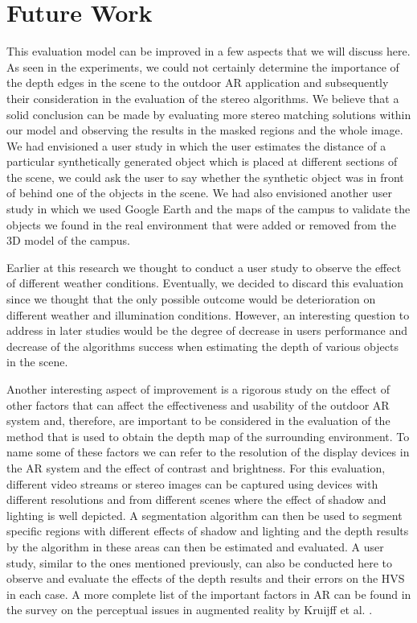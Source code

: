 \section{Future Work}
This evaluation model can be improved in a few aspects that we will discuss here.
As seen in the experiments, we could not certainly determine the importance of the depth edges in the scene to the outdoor AR application and subsequently their consideration in the evaluation 
of the stereo algorithms. We believe that a solid conclusion can be made by evaluating more stereo matching solutions
within our model and observing the results in the masked regions and the whole image. We had envisioned a user study in which the user estimates 
the distance of a particular synthetically generated object which is placed at different sections of the scene, we could ask the user
to say whether the synthetic object was in front of behind one of the objects in the scene. We had also envisioned another user study in which we used Google Earth 
and the maps of the campus to validate the objects we found in the real environment that were added or removed from the 3D model of the campus.

Earlier at this research we thought to conduct a user study to observe the effect of different weather conditions.
Eventually, we decided to discard this evaluation since we thought that the only possible outcome would be deterioration on different weather and
illumination conditions. However, an interesting question to address in later studies would be the degree of decrease in users performance and decrease of 
the algorithms success when estimating the depth of various objects in the scene.    

Another interesting aspect of improvement is a rigorous study on the effect of other factors that can affect the effectiveness and 
usability of the outdoor AR system and, therefore, 
are important to be considered in the evaluation of the method that is used to obtain the depth map of the surrounding environment. 
To name some of these factors we can refer to
the resolution of the display devices in the AR system and the effect of contrast and brightness. 
For this evaluation, different video streams or stereo images can be captured using devices with different resolutions 
and from different scenes where the effect of shadow and lighting is well depicted. A segmentation algorithm can then be used to 
segment specific regions with different effects of shadow and lighting and the depth results by the algorithm in these areas can then be estimated and evaluated. 
A user study, similar to the ones mentioned previously, can also be conducted here to observe and evaluate the effects of the depth results and 
their errors on the HVS in each case.  
A more complete list of the important factors in AR can be
found in the survey on the perceptual issues in augmented reality by Kruijff et al. \cite{kru10}.

